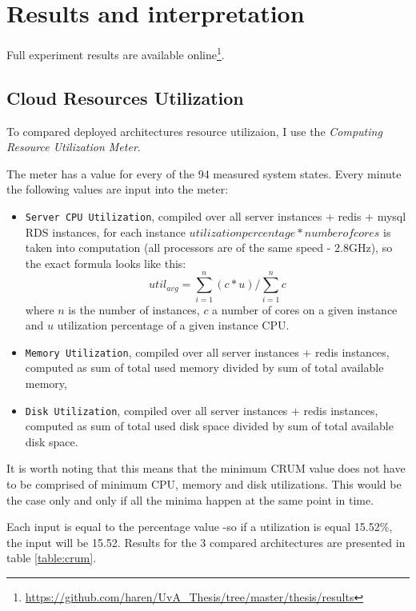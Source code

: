 \documentclass{uvamscse}
\begin{document}
\section{Results and interpretation}

Full experiment results are available online\footnote{\url{https://github.com/haren/UvA_Thesis/tree/master/thesis/results}}.

\subsection{Cloud Resources Utilization}
To compared deployed architectures resource utilizaion, I use the \textit{Computing Resource Utilization Meter}.

The meter has a value for every of the 94 measured system states. Every minute the following values are input into the meter:
\begin{itemize}
  \item \texttt{Server CPU Utilization}, compiled over all server instances + redis + mysql RDS instances, for each instance $utilization percentage * number of cores$ is taken into computation (all processors are of the same speed - 2.8GHz), so the exact formula looks like this: $$util_{avg} = \sum_{i=1}^{n}(c*u) / \sum_{i=1}^{n}c$$ where $n$ is the number of instances, $c$ a number of cores on a given instance and $u$ utilization percentage of a given instance CPU.
  \item \texttt{Memory Utilization}, compiled over all server instances + redis instances, computed as sum of total used memory divided by sum of total available memory,
  \item \texttt{Disk Utilization}, compiled over all server instances + redis instances, computed as sum of total used disk space divided by sum of total available disk space.
\end{itemize}

It is worth noting that this means that the minimum CRUM value does not have to be comprised of minimum CPU, memory and disk utilizations. This would be the case only and only if all the minima happen at the same point in time.

Each input is equal to the percentage value -so if a utilization is equal 15.52\%, the input will be 15.52. Results for the 3 compared architectures are presented in table \ref{table:crum}.
\end{document}
